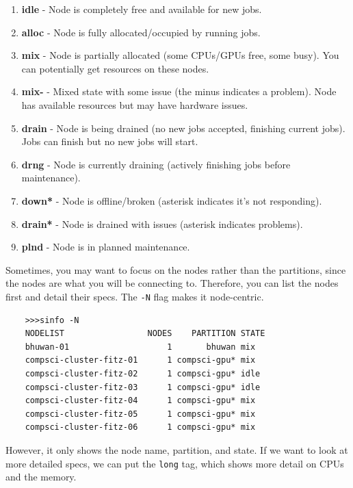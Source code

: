   \begin{definition}
    \label{def:compute-node-status-codes}
    \begin{enumerate}
      \item \textbf{idle} - Node is completely free and available for new jobs.
      \item \textbf{alloc} - Node is fully allocated/occupied by running jobs.
      \item \textbf{mix} - Node is partially allocated (some CPUs/GPUs free, some busy). You can potentially get resources on these nodes.
      \item \textbf{mix-} - Mixed state with some issue (the minus indicates a problem). Node has available resources but may have hardware issues.
      \item \textbf{drain} - Node is being drained (no new jobs accepted, finishing current jobs). Jobs can finish but no new jobs will start.
      \item \textbf{drng} - Node is currently draining (actively finishing jobs before maintenance).
      \item \textbf{down*} - Node is offline/broken (asterisk indicates it's not responding).
      \item \textbf{drain*} - Node is drained with issues (asterisk indicates problems).
      \item \textbf{plnd} - Node is in planned maintenance.
    \end{enumerate}
  \end{definition} 

  Sometimes, you may want to focus on the nodes rather than the partitions, since the nodes are what you will be connecting to. Therefore, you can list the nodes first and detail their specs. The \texttt{-N} flag makes it node-centric. 

  \begin{lstlisting}
    >>>sinfo -N              
    NODELIST                 NODES    PARTITION STATE 
    bhuwan-01                    1       bhuwan mix   
    compsci-cluster-fitz-01      1 compsci-gpu* mix   
    compsci-cluster-fitz-02      1 compsci-gpu* idle  
    compsci-cluster-fitz-03      1 compsci-gpu* idle  
    compsci-cluster-fitz-04      1 compsci-gpu* mix   
    compsci-cluster-fitz-05      1 compsci-gpu* mix   
    compsci-cluster-fitz-06      1 compsci-gpu* mix   
  \end{lstlisting}

  However, it only shows the node name, partition, and state. If we want to look at more detailed specs, we can put the \texttt{long} tag, which shows more detail on CPUs and the memory. 


